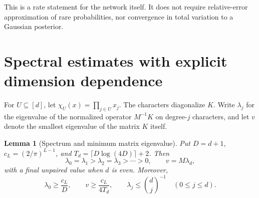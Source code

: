 \documentclass[11pt]{article}
\newtheorem{lemma}[theorem]{Lemma}
\theoremstyle{remark}\newtheorem{remark}[theorem]{Remark}
\begin{document}
This is a rate statement for the network itself. It does not require
relative-error approximation of rare probabilities, nor convergence
in total variation to a Gaussian posterior.

\section{Spectral estimates with explicit dimension dependence}
For $U\subseteq[d]$, let $\chi_U(x)=\prod_{j\in U}x_j$.
The characters diagonalize $K$. Write $\lambda_j$ for the eigenvalue
of the normalized operator $M^{-1}K$ on degree-$j$ characters, and
let $v$ denote the smallest eigenvalue of the matrix $K$ itself.

\begin{lemma}[Spectrum and minimum matrix eigenvalue]
\label{lem:spectrum}
Put $D=d+1$, $c_L=(2/\pi)^{L-1}$, and
$T_d=\lceil D\log(4D)\rceil+2$. Then
\[
 \lambda_0=\lambda_1>\lambda_2=\lambda_3>\cdots>0,
 \qquad v=M\lambda_d,
\]
with a final unpaired value when $d$ is even. Moreover,
\begin{equation}\label{eq:spectralbounds}
 \lambda_0\ge\frac{c_L}{D},\qquad
 v\ge\frac{c_L}{4T_d},\qquad
 \lambda_j\le\binom dj^{-1}\quad(0\le j\le d).
\end{equation}
\end{lemma}
\end{document}
